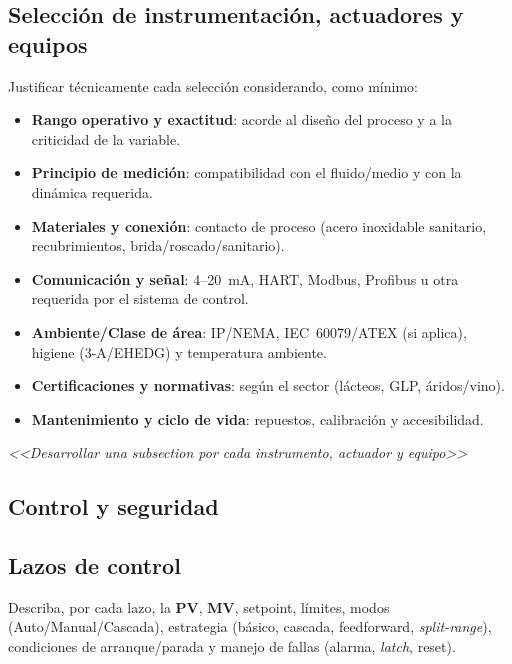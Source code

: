 \documentclass[12pt,letterpaper]{report}
\begin{document}
	\newpage
	\begin{center}
		\section{Selección de instrumentación, actuadores y equipos}
	\end{center}
	
	Justificar técnicamente cada selección considerando, como mínimo:
	\begin{itemize}
		\item \textbf{Rango operativo y exactitud}: acorde al diseño del proceso y a la criticidad de la variable.
		\item \textbf{Principio de medición}: compatibilidad con el fluido/medio y con la dinámica requerida.
		\item \textbf{Materiales y conexión}: contacto de proceso (acero inoxidable sanitario, recubrimientos, brida/roscado/sanitario).
		\item \textbf{Comunicación y señal}: 4--20~mA, HART, Modbus, Profibus u otra requerida por el sistema de control.
		\item \textbf{Ambiente/Clase de área}: IP/NEMA, IEC~60079/ATEX (si aplica), higiene (3-A/EHEDG) y temperatura ambiente.
		\item \textbf{Certificaciones y normativas}: según el sector (lácteos, GLP, áridos/vino).
		\item \textbf{Mantenimiento y ciclo de vida}: repuestos, calibración y accesibilidad.
	\end{itemize}
	\textit{<<Desarrollar una subsection por cada instrumento, actuador y equipo>>}
	
	\newpage
	\begin{center}
		\section{Control y seguridad}
	\end{center}
	
	\subsection{Lazos de control}
	Describa, por cada lazo, la \textbf{PV}, \textbf{MV}, setpoint, límites, modos (Auto/Manual/Cascada), estrategia (básico, cascada, feedforward, \textit{split-range}), condiciones de arranque/parada y manejo de fallas (alarma, \emph{latch}, reset).
	
\end{document}
